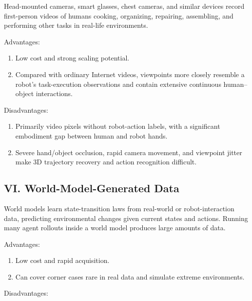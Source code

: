 Head-mounted cameras, smart glasses, chest cameras, and similar devices record first-person videos of humans cooking, organizing, repairing, assembling, and performing other tasks in real-life environments.

Advantages:

\begin{enumerate}
\def\labelenumi{\arabic{enumi}.}
\item
  Low cost and strong scaling potential.
\item
  Compared with ordinary Internet videos, viewpoints more closely resemble a robot's task-execution observations and contain extensive continuous human--object interactions.
\end{enumerate}

Disadvantages:

\begin{enumerate}
\def\labelenumi{\arabic{enumi}.}
\item
  Primarily video pixels without robot-action labels, with a significant embodiment gap between human and robot hands.
\item
  Severe hand/object occlusion, rapid camera movement, and viewpoint jitter make 3D trajectory recovery and action recognition difficult.
\end{enumerate}

\hypertarget{vi.-world-model-generated-data}{%
\subsection{VI. World-Model-Generated Data}\label{vi.-world-model-generated-data}}

World models learn state-transition laws from real-world or robot-interaction data, predicting environmental changes given current states and actions. Running many agent rollouts inside a world model produces large amounts of data.

Advantages:

\begin{enumerate}
\def\labelenumi{\arabic{enumi}.}
\item
  Low cost and rapid acquisition.
\item
  Can cover corner cases rare in real data and simulate extreme environments.
\end{enumerate}

Disadvantages:

